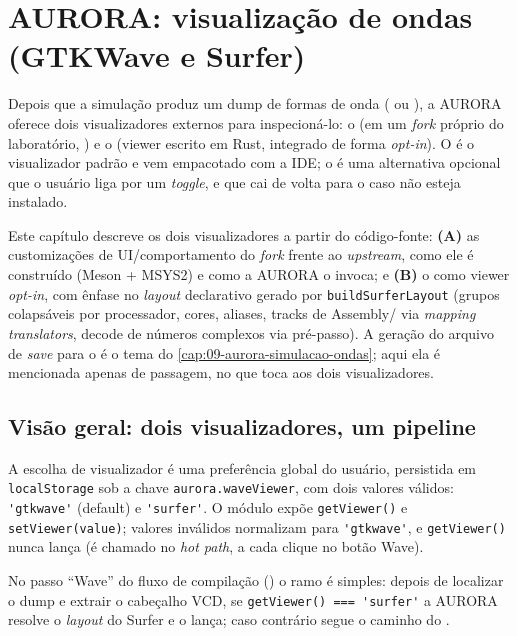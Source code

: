 \chapter{AURORA: visualização de ondas (GTKWave e Surfer)}
\label{cap:10-aurora-visualizacao-gtkwave-surfer}

Depois que a simulação produz um dump de formas de onda ( ou ),
a AURORA oferece dois visualizadores externos para inspecioná-lo: o 
(em um \emph{fork} próprio do laboratório, ) e o 
(viewer escrito em Rust, integrado de forma \emph{opt-in}). O  é o
visualizador padrão e vem empacotado com a IDE; o  é uma alternativa
opcional que o usuário liga por um \emph{toggle}, e que cai de volta para o
 caso não esteja instalado.

Este capítulo descreve os dois visualizadores a partir do código-fonte:
\textbf{(A)} as customizações de UI/comportamento do \emph{fork} 
 frente ao \emph{upstream}, como ele é construído (Meson +
MSYS2) e como a AURORA o invoca; e \textbf{(B)} o  como viewer
\emph{opt-in}, com ênfase no \emph{layout} declarativo  gerado por
\lstinline|buildSurferLayout| (grupos colapsáveis por processador, cores, aliases,
tracks de Assembly/\cmm{} via \emph{mapping translators}, decode de números
complexos via pré-passo). A geração do arquivo de \emph{save}  para o
 é o tema do \autoref{cap:09-aurora-simulacao-ondas}; aqui ela é
mencionada apenas de passagem, no que toca aos dois visualizadores.

\section{Visão geral: dois visualizadores, um pipeline}
\label{sec:cap10-visao-geral}

A escolha de visualizador é uma preferência global do usuário, persistida em
\lstinline|localStorage| sob a chave \lstinline|aurora.waveViewer|, com dois valores
válidos: \lstinline|'gtkwave'| (default) e \lstinline|'surfer'|. O módulo
 expõe \lstinline|getViewer()| e
\lstinline|setViewer(value)|; valores inválidos normalizam para \lstinline|'gtkwave'|,
e \lstinline|getViewer()| nunca lança (é chamado no \emph{hot path}, a cada clique no
botão Wave).

No passo \enquote{Wave} do fluxo de compilação ()
o ramo é simples: depois de localizar o dump e extrair o cabeçalho VCD, se
\lstinline|getViewer() === 'surfer'| a AURORA resolve o \emph{layout} do Surfer e o
lança; caso contrário segue o caminho do .

